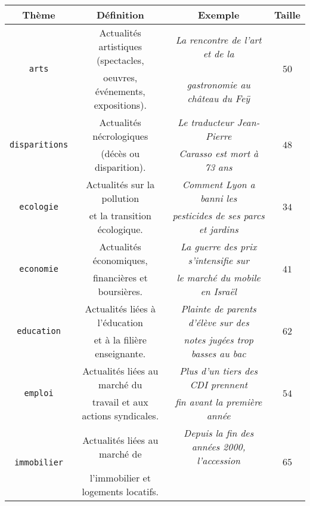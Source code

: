 		\begin{table}[!htb]
			\begin{center}
			\begin{scriptsize}
			\begin{tabular}{|c|c|c|c|}
			
				\hline
				\rowcolor{colorTableHeader!15}
				\textbf{Thème}
					& \textbf{Définition}
					& \textbf{Exemple}
					& \textbf{Taille}
					\tabularnewline
					\hline \hline
				\multirow{2}{*}{\texttt{arts}}
					& Actualités artistiques (spectacles,
					& \textit{La rencontre de l'art et de la }
					& \multirow{2}{*}{$50$}
					\tabularnewline
					& oeuvres, événements, expositions).
					& \textit{gastronomie au château du Feÿ}
					&
					\tabularnewline
					\hline
				\multirow{2}{*}{\texttt{disparitions}}
					& Actualités nécrologiques 
					& \textit{Le traducteur Jean-Pierre}
					& \multirow{2}{*}{$48$}
					\tabularnewline
					& (décès ou disparition).
					& \textit{Carasso est mort à 73 ans}
					&
					\tabularnewline
					\hline
				\multirow{2}{*}{\texttt{ecologie}}
					& Actualités sur la pollution
					& \textit{Comment Lyon a banni les}
					& \multirow{2}{*}{$34$}
					\tabularnewline
					& et la transition écologique.
					& \textit{pesticides de ses parcs et jardins}
					&
					\tabularnewline
					\hline
				\multirow{2}{*}{\texttt{economie}}
					& Actualités économiques,
					& \textit{La guerre des prix s'intensifie sur}
					& \multirow{2}{*}{$41$}
					\tabularnewline
					& financières et boursières.
					& \textit{le marché du mobile en Israël}
					&
					\tabularnewline
					\hline
				\multirow{2}{*}{\texttt{education}}
					& Actualités liées à l'éducation
					& \textit{Plainte de parents d'élève sur des}
					& \multirow{2}{*}{$62$}
					\tabularnewline
					& et à la filière enseignante.
					& \textit{notes jugées trop basses au bac}
					&
					\tabularnewline
					\hline
				\multirow{2}{*}{\texttt{emploi}}
					& Actualités liées au marché du
					& \textit{Plus d'un tiers des CDI prennent}
					& \multirow{2}{*}{$54$}
					\tabularnewline
					& travail et aux actions syndicales.
					& \textit{ fin avant la première année}
					&
					\tabularnewline
					\hline
				\multirow{2}{*}{\texttt{immobilier}}
					& Actualités liées au marché de
					& \textit{Depuis la fin des années 2000, l'accession}
					& \multirow{2}{*}{$65$}
					\tabularnewline
					& l'immobilier et logements locatifs.

\end{tabular}
\end{scriptsize}
\end{center}
\end{table}

